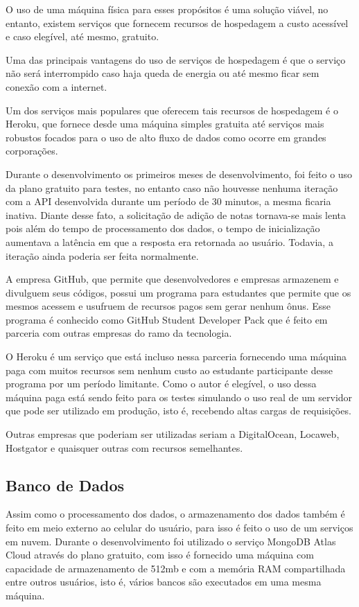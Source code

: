 O uso de uma máquina física para esses propósitos é uma solução viável, no entanto, existem serviços que fornecem recursos de hospedagem a custo acessível e caso elegível, até mesmo, gratuito.

Uma das principais vantagens do uso de serviços de hospedagem é que o serviço não será interrompido caso haja queda de energia ou até mesmo ficar sem conexão com a internet.

Um dos serviços mais populares que oferecem tais recursos de hospedagem é o Heroku, que fornece desde uma máquina simples gratuita até serviços mais robustos focados para o uso de alto fluxo de dados como ocorre em grandes corporações.

Durante o desenvolvimento os primeiros meses de desenvolvimento, foi feito o uso da plano gratuito para testes, no entanto caso não houvesse nenhuma iteração com a API desenvolvida durante um período de 30 minutos, a mesma ficaria inativa. Diante desse fato, a solicitação de adição de notas tornava-se mais lenta pois além do tempo de processamento dos dados, o tempo de inicialização aumentava a latência em que a resposta era retornada ao usuário. Todavia, a iteração ainda poderia ser feita normalmente.

A empresa GitHub, que permite que desenvolvedores e empresas armazenem e divulguem seus códigos, possui um programa para estudantes que permite que os mesmos acessem e usufruem de recursos pagos sem gerar nenhum ônus. Esse programa é conhecido como GitHub Student Developer Pack que é feito em parceria com outras empresas do ramo da tecnologia.

O Heroku é um serviço que está incluso nessa parceria fornecendo uma máquina paga com muitos recursos sem nenhum custo ao estudante participante desse programa por um período limitante. Como o autor é elegível, o uso dessa máquina paga está sendo feito para os testes simulando o uso real de um servidor que pode ser utilizado em produção, isto é, recebendo altas cargas de requisições.

Outras empresas que poderiam ser utilizadas seriam a DigitalOcean, Locaweb, Hostgator e quaisquer outras com recursos semelhantes.

\subsection{Banco de Dados}

Assim como o processamento dos dados, o armazenamento dos dados também é feito em meio externo ao celular do usuário, para isso é feito o uso de um serviços em nuvem. Durante o desenvolvimento foi utilizado o serviço MongoDB Atlas Cloud através do plano gratuito, com isso é fornecido uma máquina com capacidade de armazenamento de 512mb e com a memória RAM compartilhada entre outros usuários, isto é, vários bancos são executados em uma mesma máquina.

